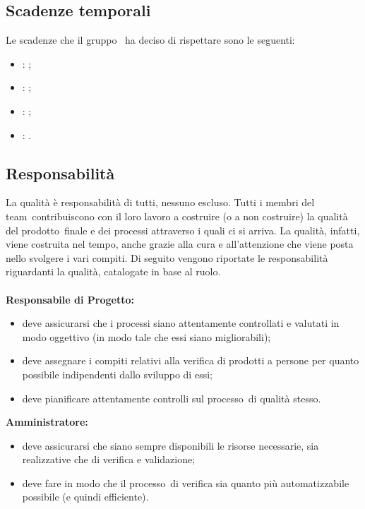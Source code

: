 \documentclass[../PianoDiQualifica.tex]{subfiles}
\begin{document}
	\subsection{Scadenze temporali}
	Le scadenze che il gruppo \leaf\ ha deciso di rispettare sono le seguenti:
	\begin{itemize}
		\item \revisionedeirequisiti: ;
		\item \revisionediprogettazione: ;
		\item \revisionediqualifica: ;
		\item \revisionediaccettazione: .
	\end{itemize}
	\subsection{Responsabilità}
		La qualità è responsabilità di tutti, nessuno escluso. Tutti i membri del team\g\ contribuiscono con il loro lavoro a costruire (o a non costruire) la qualità del prodotto\g\ finale e dei processi attraverso i quali ci si arriva. La qualità, infatti, viene costruita nel tempo, anche grazie alla cura e all'attenzione che viene posta nello svolgere i vari compiti.
		Di seguito vengono riportate le responsabilità riguardanti la qualità, catalogate in base al ruolo.
		\\\\\textbf{Responsabile di Progetto:}
			 \begin{itemize}
				\item deve assicurarsi che i processi siano attentamente controllati e valutati in modo oggettivo (in modo tale che essi siano migliorabili);
				\item deve assegnare i compiti relativi alla verifica di prodotti a persone per quanto possibile indipendenti dallo sviluppo di essi;
				\item deve pianificare attentamente controlli sul processo\g\ di qualità stesso.
			\end{itemize}
 			\textbf{Amministratore:}
			\begin{itemize}
				\item deve assicurarsi che siano sempre disponibili le risorse necessarie, sia realizzative che di verifica e validazione;
				\item deve fare in modo che il processo\g\ di verifica sia quanto più automatizzabile possibile (e quindi efficiente).
			\end{itemize}
\end{document}
